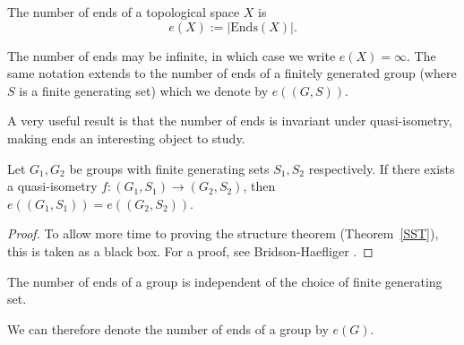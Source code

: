 \begin{comment}
Let \(E(r)\) be the equivalence class of \(r \in R\). For a sequence of rays \(\{r_n\}_{n \in \mathbb{N}} \in R\), convergence \(E(r_n) \to E(r)\) as \(n\) tends to infinity is defined by the following condition: for every compact set \(C \in X\), there exists a sequence of integers \(N_n\) such that \(r_n[N_n, \infty]\) and \(r[N_n, \infty]\) lie in the same path component of \(X \setminus C\) whenever \(n\) is sufficiently large. A subset \(B \subset \mathrm{Ends}(X)\) is defined to be closed if the following holds: if \(E(r_n) \in B\) for all \(n \in \mathbb{N}\), then \(E(r_n) \to E(r)\) implies \(E(r) \in B\).
\end{comment}

\begin{definition}
    The number of ends of a topological space \(X\) is 
    \[
        e(X) := |\mathrm{Ends}(X)|.
    \]
\end{definition}

The number of ends may be infinite, in which case we write \(e(X) = \infty\). The same notation extends to the number of ends of a finitely generated group (where \(S\) is a finite generating set) which we denote by \(e((G,S))\). 

A very useful result is that the number of ends is invariant under quasi-isometry, making ends an interesting object to study. 

\begin{theorem}
    Let \(G_1,G_2\) be groups with finite generating sets \(S_1,S_2\) respectively. If there exists a quasi-isometry \(f: (G_1, S_1) \to (G_2,S_2)\), then \(e((G_1,S_1)) = e((G_2,S_2))\).
\end{theorem}

\begin{proof}
    To allow more time to proving the structure theorem (Theorem~\ref{SST}), this is taken as a black box. For a proof, see Bridson-Haefliger \cite[p.~145]{bridson_haefliger_metric_1999}.
\end{proof}

\begin{corollary}
    The number of ends of a group is independent of the choice of finite generating set.
\end{corollary}

We can therefore denote the number of ends of a group by \(e(G)\). 

